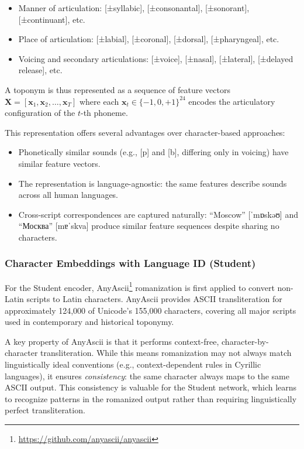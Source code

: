 \documentclass[11pt]{article}
\begin{document}
    \begin{itemize}
        \item Manner of articulation: [±syllabic], [±consonantal], [±sonorant], [±continuant], etc.
        \item Place of articulation: [±labial], [±coronal], [±dorsal], [±pharyngeal], etc.
        \item Voicing and secondary articulations: [±voice], [±nasal], [±lateral], [±delayed release], etc.
    \end{itemize}

    A toponym is thus represented as a sequence of feature vectors $\mathbf{X} = [\mathbf{x}_1, \mathbf{x}_2, \ldots, \mathbf{x}_T]$ where each $\mathbf{x}_t \in \{-1, 0, +1\}^{24}$ encodes the articulatory configuration of the $t$-th phoneme.

    This representation offers several advantages over character-based approaches:
    \begin{itemize}
        \item Phonetically similar sounds (e.g., [p] and [b], differing only in voicing) have similar feature vectors.
        \item The representation is language-agnostic: the same features describe sounds across all human languages.
        \item Cross-script correspondences are captured naturally: ``Moscow'' [ˈmɒskəʊ] and ``Москва'' [mɐˈskva] produce similar feature sequences despite sharing no characters.
    \end{itemize}

    \subsubsection{Character Embeddings with Language ID (Student)}

    For the Student encoder, AnyAscii\footnote{\url{https://github.com/anyascii/anyascii}} romanization is first applied to convert non-Latin scripts to Latin characters. AnyAscii provides ASCII transliteration for approximately 124,000 of Unicode's 155,000 characters, covering all major scripts used in contemporary and historical toponymy.

    A key property of AnyAscii is that it performs context-free, character-by-character transliteration. While this means romanization may not always match linguistically ideal conventions (e.g., context-dependent rules in Cyrillic languages), it ensures \emph{consistency}: the same character always maps to the same ASCII output. This consistency is valuable for the Student network, which learns to recognize patterns in the romanized output rather than requiring linguistically perfect transliteration.
\end{document}
